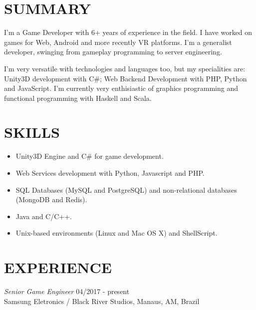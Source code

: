 \documentclass[line,margin]{res}
\begin{document}

\address{Rua Prof. Virginio Marques, 201, Bloco F, Res. Eliza Miranda - Manaus, AM - Brazil}
\address{+55 11 999326440 - bruno@croci.me - \href{http://bruno.croci.me/}{http://bruno.croci.me/}}

 
\begin{resume}
 
\section{SUMMARY} I'm a Game Developer with 6+ years of experience in the field. I have worked on games for Web, Android and more recently VR platforms. I'm a generalist developer, swinging from gameplay programming to server engineering.

I'm very versatile with technologies and languages too, but my specialities are: Unity3D development with C\#; Web Backend Development with PHP, Python and JavaScript. I'm currently very enthisiastic of graphics programming and functional programming with Haskell and Scala.
 
\section{SKILLS} \begin{itemize}  \itemsep 1.25pt
				 \item Unity3D Engine and C\# for game development.
				 \item Web Services development with Python, Javascript and PHP.
				 \item SQL Databases (MySQL and PostgreSQL) and non-relational databases (MongoDB and Redis).
                 \item Java and C/C++.
                 \item Unix-based environments (Linux and Mac OS X) and ShellScript.
                 \end{itemize}
 
\section{EXPERIENCE} {\sl Senior Game Engineer} \hfill 04/2017 - present \\
                Samsung Eletronics / Black River Studios, Manaus, AM, Brazil


\end{resume}
\end{document}
